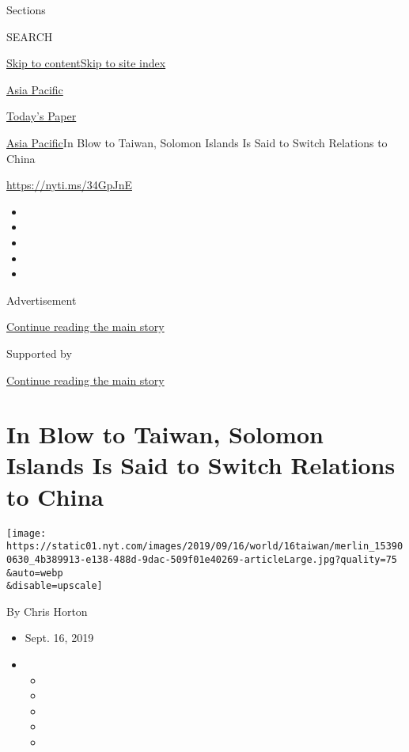 Sections

SEARCH

\protect\hyperlink{site-content}{Skip to
content}\protect\hyperlink{site-index}{Skip to site index}

\href{https://www.nytimes.com/section/world/asia}{Asia Pacific}

\href{https://myaccount.nytimes.com/auth/login?response_type=cookie\&client_id=vi}{}

\href{https://www.nytimes.com/section/todayspaper}{Today's Paper}

\href{/section/world/asia}{Asia Pacific}\textbar{}In Blow to Taiwan,
Solomon Islands Is Said to Switch Relations to China

\url{https://nyti.ms/34GpJnE}

\begin{itemize}
\item
\item
\item
\item
\item
\end{itemize}

Advertisement

\protect\hyperlink{after-top}{Continue reading the main story}

Supported by

\protect\hyperlink{after-sponsor}{Continue reading the main story}

\hypertarget{in-blow-to-taiwan-solomon-islands-is-said-to-switch-relations-to-china}{%
\section{In Blow to Taiwan, Solomon Islands Is Said to Switch Relations
to
China}\label{in-blow-to-taiwan-solomon-islands-is-said-to-switch-relations-to-china}}

\texttt{[image: https://static01.nyt.com/images/2019/09/16/world/16taiwan/merlin\_153900630\_4b389913-e138-488d-9dac-509f01e40269-articleLarge.jpg?quality=75\\\&auto=webp\\\&disable=upscale]}

By Chris Horton

\begin{itemize}
\item
  Sept. 16, 2019
\item
  \begin{itemize}
  \item
  \item
  \item
  \item
  \item
  \end{itemize}
\end{itemize}

